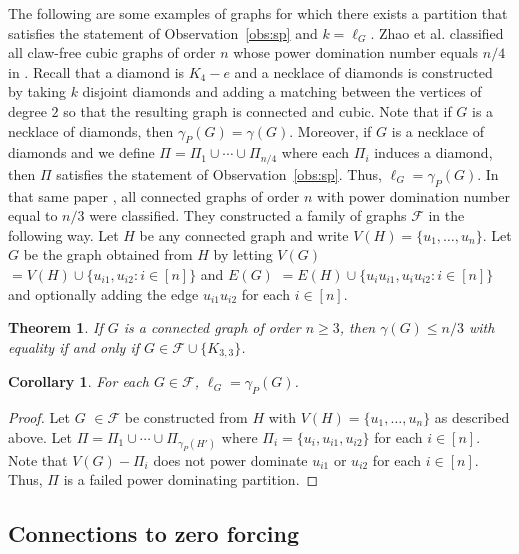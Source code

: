 \documentclass[11pt]{article}
\newtheorem{theorem}{Theorem}
\newtheorem{corollary}{Corollary}
\begin{document}
The following are some examples of graphs for which there exists a partition that satisfies the statement of Observation~\ref{obs:sp} and $k=\ell_G$. Zhao et al. classified all claw-free cubic graphs of order $n$ whose power domination number equals $n/4$ in \cite{ZKC_cubic}. Recall that a diamond is $K_4-e$ and a necklace of diamonds is constructed by taking $k$ disjoint diamonds and adding a matching between the vertices of degree $2$ so that the resulting graph is connected and cubic. Note that if $G$ is a necklace of diamonds, then $\gamma_P(G) = \gamma(G)$. Moreover, if $G$ is a necklace of diamonds and we define $\Pi = \Pi_1 \cup \cdots \cup \Pi_{n/4}$ where each $\Pi_i$ induces a diamond, then $\Pi$ satisfies the statement of Observation~\ref{obs:sp}. Thus, $\ell_G = \gamma_P(G)$. In that same paper \cite{ZKC_cubic}, all connected graphs of order $n$ with power domination number equal to $n/3$ were classified. They constructed a family of graphs $\mathcal F$ in the following way. Let $H$ be any connected graph and write $V(H) = \{u_1, \dots, u_n\}$. Let $G$ be the graph obtained from $H$ by letting $V(G)$ $= V(H) \cup \{u_{i1}, u_{i2}: i \in [n]\}$ and $E(G)$ $= E(H) \cup \{u_iu_{i1}, u_iu_{i2}: i \in [n]\}$ and optionally adding the edge $u_{i1}u_{i2}$ for each $i \in [n]$. 


\begin{theorem} \cite{ZKC_cubic} If $G$ is a connected graph of order $n \geq 3$, then $\gamma(G) \leq n/3$ with equality if and only if $G \in \mathcal{F} \cup \{K_{3, 3}\}$.
\end{theorem}

\begin{corollary} For each $G \in \mathcal{F}$, $\ell_G = \gamma_P(G)$. 
\end{corollary}
\begin{proof} Let $G$ $\in \mathcal{F}$ be constructed from $H$ with $V(H) = \{u_1, \dots, u_n\}$ as described above. Let $\Pi = \Pi_1 \cup \cdots \cup \Pi_{\gamma_P(H')}$ where $\Pi_i = \{u_i, u_{i1}, u_{i2}\}$ for each $i \in [n]$. Note that $V(G)- \Pi_i$ does not power dominate $u_{i1}$ or $u_{i2}$ for each $i \in [n]$. Thus, $\Pi$ is a failed power dominating partition. 
\end{proof}



 


  \subsection{Connections to zero forcing} \label{sec:zf}
\end{document}
